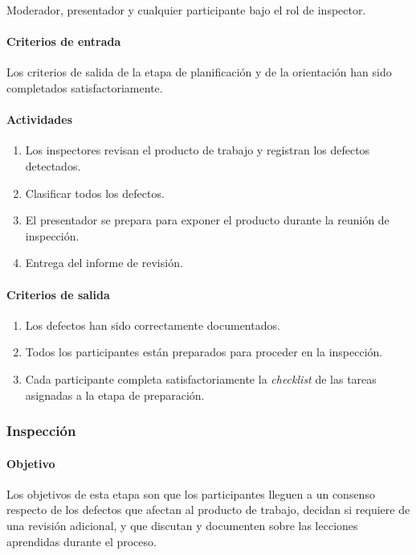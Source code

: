 Moderador, presentador y cualquier participante bajo el rol de inspector.

\paragraph{Criterios de entrada\\}

Los criterios de salida de la etapa de planificación y de la orientación han sido completados satisfactoriamente.

\paragraph{Actividades}
\begin{enumerate}
	\item 
		Los inspectores revisan el producto de trabajo y registran los defectos detectados.
	\item
		Clasificar todos los defectos.
	\item
		El presentador se prepara para exponer el producto durante la reunión de inspección.
	\item
		Entrega del informe de revisión.
\end{enumerate}

\paragraph{Criterios de salida}

\begin{enumerate}
	\item 
		Los defectos han sido correctamente documentados. 
	\item
		Todos los participantes están preparados para proceder en la inspección.
	\item
		Cada participante completa satisfactoriamente la \textit{checklist} de las tareas asignadas a la etapa de preparación.
\end{enumerate}

\subsubsection{Inspección}

\paragraph{Objetivo\\}

Los objetivos de esta etapa son que los participantes lleguen a un consenso respecto de los defectos que afectan al producto de trabajo, decidan si requiere de una revisión adicional, y que discutan y documenten sobre las lecciones aprendidas durante el proceso.

